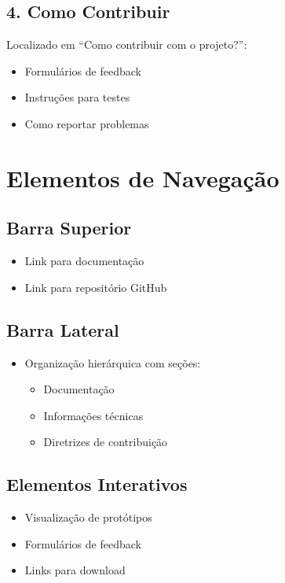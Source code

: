 \subsection{4. Como Contribuir}
Localizado em ``Como contribuir com o projeto?'':
\begin{itemize}
    \item Formulários de feedback
    \item Instruções para testes
    \item Como reportar problemas
\end{itemize}

\section{Elementos de Navegação}

\subsection{Barra Superior}
\begin{itemize}
    \item Link para documentação
    \item Link para repositório GitHub
\end{itemize}

\subsection{Barra Lateral}
\begin{itemize}
    \item Organização hierárquica com seções:
    \begin{itemize}
        \item Documentação
        \item Informações técnicas
        \item Diretrizes de contribuição
    \end{itemize}
\end{itemize}

\subsection{Elementos Interativos}
\begin{itemize}
    \item Visualização de protótipos
    \item Formulários de feedback
    \item Links para download
\end{itemize}

